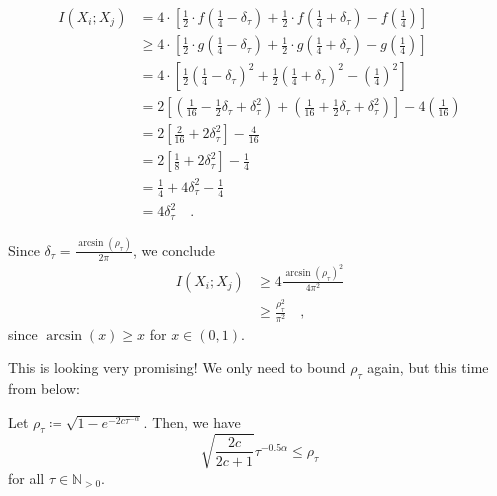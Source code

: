 \documentclass[../../main.tex]{subfiles}
\begin{document}
\begin{align*}
    I(X_i; X_j) &= 4 \cdot \left[ \frac{1}{2} \cdot f(\frac{1}{4} - \delta_\tau) + \frac{1}{2} \cdot f(\frac{1}{4} + \delta_\tau) - f(\frac{1}{4}) \right] \\
    &\geq 4 \cdot \left[ \frac{1}{2} \cdot g(\frac{1}{4} - \delta_\tau) + \frac{1}{2} \cdot g(\frac{1}{4} + \delta_\tau) - g(\frac{1}{4}) \right] \\
    &= 4 \cdot \left[ \frac{1}{2} \left(\frac{1}{4} - \delta_\tau\right)^2 + \frac{1}{2} \left(\frac{1}{4} + \delta_\tau\right)^2 - \left(\frac{1}{4}\right)^2 \right] \\
    &= 2 \left[ \left(\frac{1}{16} - \frac{1}{2}\delta_\tau + \delta_\tau^2\right) + \left(\frac{1}{16} + \frac{1}{2}\delta_\tau + \delta_\tau^2\right) \right] - 4\left(\frac{1}{16}\right) \\
    &= 2 \left[ \frac{2}{16} + 2\delta_\tau^2 \right] - \frac{4}{16} \\
    &= 2 \left[ \frac{1}{8} + 2\delta_\tau^2 \right] - \frac{1}{4} \\
    &= \frac{1}{4} + 4\delta_\tau^2 - \frac{1}{4} \\
    &= 4\delta_\tau^2 \quad .
\end{align*}

Since $\delta_\tau = \frac{\arcsin(\rho_\tau)}{2\pi}$, we conclude
\begin{align*}
    I(X_i; X_j) &\geq 4 \frac{\arcsin(\rho_\tau)^2}{4\pi^2} \\
    &\geq \frac{\rho_\tau^2}{\pi^2} \quad ,
\end{align*}
since $\arcsin(x) \geq x$ for $x \in (0, 1)$.

This is looking very promising! We only need to bound $\rho_\tau$ again, but this time from below:

\begin{lemma}
    \label{lemma:bounding_rho}
    Let $\rho_\tau \coloneqq \sqrt{1 - e^{-2c \tau^{-\alpha}}}$. Then, we have
    \[
        \sqrt{\frac{2c}{2c + 1}} \tau^{-0.5 \alpha} \leq \rho_\tau
    \]
    for all $\tau \in \mathbb{N}_{>0}$.
\end{lemma}
\end{document}
